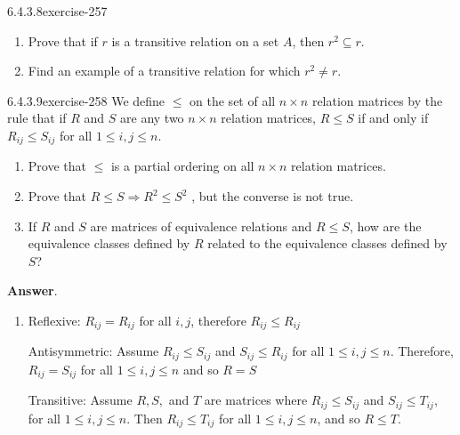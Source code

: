 \documentclass[twoside,10pt,]{book}
\numberwithin{equation}{section}
\begin{document}
\begin{divisionsolution}{6.4.3.8}{}{exercise-257}%
\hypertarget{p-2171}{}%
\leavevmode%
\begin{enumerate}[label=(\alph*)]
\item\hypertarget{li-1147}{}\hypertarget{p-2172}{}%
Prove that if \(r\) is a transitive relation on a set \(A\), then \(r^2 \subseteq  r\).%
\item\hypertarget{li-1148}{}\hypertarget{p-2173}{}%
Find an example of a transitive relation for which \(r^2\neq r\).%
\end{enumerate}
%
\end{divisionsolution}%
\begin{divisionsolution}{6.4.3.9}{}{exercise-258}%
\hypertarget{p-2174}{}%
We define \(\leq\) on the set of all \(n\times n\) relation matrices by the rule that if \(R\) and \(S\) are any two \(n\times n\) relation matrices, \(R \leq  S\) if and only if \(R_{ij} \leq S_{ij}\) for all \(1 \leq  i, j \leq  n\).%
\par
\hypertarget{p-2175}{}%
\leavevmode%
\begin{enumerate}[label=(\alph*)]
\item\hypertarget{li-1149}{}\hypertarget{p-2176}{}%
Prove that \(\leq\) is a partial ordering on all \(n\times n\) relation matrices.%
\item\hypertarget{li-1150}{}\hypertarget{p-2177}{}%
Prove that \(R \leq  S  \Rightarrow   R^2\leq S^2\) , but the converse is not true.%
\item\hypertarget{li-1151}{}\hypertarget{p-2178}{}%
If \(R\) and \(S\) are matrices of equivalence relations and \(R \leq  S\), how are the equivalence classes defined by \(R\) related to the equivalence classes defined by \(S\)?%
\end{enumerate}
%
\par\smallskip%
\noindent\textbf{Answer}.\quad%
\hypertarget{p-2179}{}%
\leavevmode%
\begin{enumerate}[label=(\alph*)]
\item\hypertarget{li-1152}{}\hypertarget{p-2180}{}%
Reflexive: \(R_{ij}=R_{ij}\) for all \(i,j\), therefore \(R_{ij}\leq R_{ij}\)%
\par
\hypertarget{p-2181}{}%
Antisymmetric: Assume \(R_{ij}\leq S_{ij}\) and \(S_{ij}\leq R_{ij}\) for all \(1\leq i,j\leq n\). Therefore, \(R_{ij} = S_{ij}\) for all \(1\leq i,j\leq n\)  and so \(R=S\)%
\par
\hypertarget{p-2182}{}%
Transitive: Assume \(R, S,\) and \(T\) are matrices where \(R_{ij}\leq S_{ij}\) and \(S_{ij}\leq T_{ij}\), for all \(1\leq i,j\leq n\). Then \(R_{ij}\leq T_{ij}\) for all \(1\leq i,j\leq n\), and so \(R\leq T\).%

\end{enumerate}
\end{divisionsolution}
\end{document}
